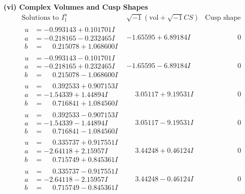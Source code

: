 \documentclass[1p]{elsarticle_modified}
\theoremstyle{definition}
\newcommand{\I}{\sqrt{-1}}
\begin{document}
\newpage\flushleft \textbf{(vi) Complex Volumes and Cusp Shapes}
$$\begin{array}{c|c|c}  
\text{Solutions to }I^u_{1}& \I (\text{vol} + \sqrt{-1}CS) & \text{Cusp shape}\\
 \hline 
\begin{aligned}
u &= -0.993143 + 0.101701 I \\
a &= -0.218165 - 0.232465 I \\
b &= \phantom{-}0.215078 + 1.068600 I\end{aligned}
 & -1.65595 + 6.89184 I & \phantom{-0.000000 } 0 \\ \hline\begin{aligned}
u &= -0.993143 - 0.101701 I \\
a &= -0.218165 + 0.232465 I \\
b &= \phantom{-}0.215078 - 1.068600 I\end{aligned}
 & -1.65595 - 6.89184 I & \phantom{-0.000000 } 0 \\ \hline\begin{aligned}
u &= \phantom{-}0.392533 + 0.907153 I \\
a &= -1.54339 + 1.44894 I \\
b &= \phantom{-}0.716841 + 1.084560 I\end{aligned}
 & \phantom{-}3.05117 + 9.19531 I & \phantom{-0.000000 } 0 \\ \hline\begin{aligned}
u &= \phantom{-}0.392533 - 0.907153 I \\
a &= -1.54339 - 1.44894 I \\
b &= \phantom{-}0.716841 - 1.084560 I\end{aligned}
 & \phantom{-}3.05117 - 9.19531 I & \phantom{-0.000000 } 0 \\ \hline\begin{aligned}
u &= \phantom{-}0.335737 + 0.917551 I \\
a &= -2.64118 + 2.15957 I \\
b &= \phantom{-}0.715749 + 0.845361 I\end{aligned}
 & \phantom{-}3.44248 + 0.46124 I & \phantom{-0.000000 } 0 \\ \hline\begin{aligned}
u &= \phantom{-}0.335737 - 0.917551 I \\
a &= -2.64118 - 2.15957 I \\
b &= \phantom{-}0.715749 - 0.845361 I\end{aligned}
 & \phantom{-}3.44248 - 0.46124 I & \phantom{-0.000000 } 0 \\ \hline\begin{aligned}

\end{aligned}
\end{array}$$
\end{document}

